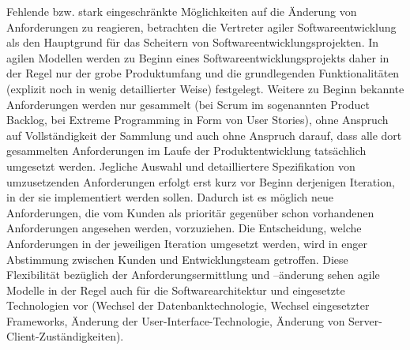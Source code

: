 Fehlende bzw. stark eingeschränkte Möglichkeiten auf die Änderung von Anforderungen zu reagieren, betrachten die Vertreter agiler Softwareentwicklung als den Hauptgrund für das Scheitern von Softwareentwicklungsprojekten. In agilen Modellen werden zu Beginn eines Softwareentwicklungsprojekts daher in der Regel nur der grobe Produktumfang und die grundlegenden Funktionalitäten (explizit noch in wenig detaillierter Weise) festgelegt. Weitere zu Beginn bekannte Anforderungen werden nur gesammelt (\zb bei Scrum im sogenannten Product Backlog, bei Extreme Programming  in Form von User Stories), ohne Anspruch auf Vollständigkeit der Sammlung und auch ohne Anspruch da\-rauf, dass alle dort gesammelten Anforderungen im Laufe der Produktentwicklung tatsächlich umgesetzt werden. Jegliche Auswahl und detailliertere Spezifikation von umzusetzenden Anforderungen erfolgt erst kurz vor Beginn derjenigen Iteration, in der sie implementiert werden sollen. Dadurch ist es möglich neue Anforderungen, die vom Kunden als prioritär gegenüber schon vorhandenen Anforderungen angesehen werden, vorzuziehen. Die Entscheidung, welche Anforderungen in der jeweiligen Iteration umgesetzt werden, wird in enger Abstimmung zwischen Kunden und Entwicklungsteam getroffen. Diese Flexibilität bezüglich der Anforderungsermittlung und –änderung sehen agile Modelle in der Regel auch für die Softwarearchitektur und eingesetzte Technologien vor (\zb Wechsel der Datenbanktechnologie, Wechsel eingesetzter Frameworks, Änderung der User-Interface-Technologie, Änderung von Server-Client-Zuständigkeiten).

